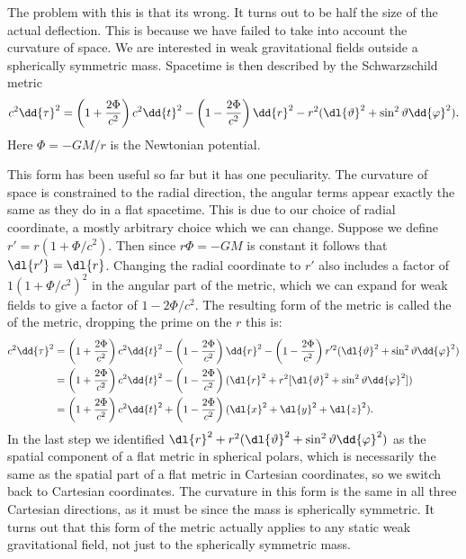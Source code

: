 \documentclass[fleqn]{NotesClass}
\begin{document}
    The problem with this is that its wrong.
    It turns out to be half the size of the actual deflection.
    This is because we have failed to take into account the curvature of space.
    We are interested in weak gravitational fields outside a spherically symmetric mass.
    Spacetime is then described by the Schwarzschild metric
    \begin{equation}
        c^2\dd{\tau}^2 = \left( 1 + \frac{2\Phi}{c^2} \right)c^2\dd{t}^2 - \left( 1 - \frac{2\Phi}{c^2} \right)\dd{r}^2 - r^2(\dl{\vartheta}^2 + \sin^2\vartheta \dd{\varphi}^2).
    \end{equation}
    Here \(\Phi = -GM/r\) is the Newtonian potential.
    
    This form has been useful so far but it has one peculiarity.
    The curvature of space is constrained to the radial direction, the angular terms appear exactly the same as they do in a flat spacetime.
    This is due to our choice of radial coordinate, a mostly arbitrary choice which we can change.
    Suppose we define \(r' = r(1 + \Phi/c^2)\).
    Then since \(r\Phi = -GM\) is constant it follows that \(\dl{r'} = \dl{r}\).
    Changing the radial coordinate to \(r'\) also includes a factor of \(1(1 + \Phi/c^2)^2\) in the angular part of the metric, which we can expand for weak fields to give a factor of \(1 - 2\Phi/c^2\).
    The resulting form of the metric is called the  of the metric, dropping the prime on the \(r\) this is:
    \begin{align}
        c^2\dd{\tau}^2 &= \left( 1 + \frac{2\Phi}{c^2} \right)c^2\dd{t}^2 - \left( 1 - \frac{2\Phi}{c^2} \right) \dd{r}^2 - \left( 1 - \frac{2\Phi}{c^2} \right) r'^2 (\dl{\vartheta}^2 + \sin^2 \vartheta \dd{\varphi}^2)\\
        &= \left( 1 + \frac{2\Phi}{c^2} \right) c^2 \dd{t}^2 - \left( 1 - \frac{2\Phi}{c^2} \right)(\dl{r}^2 + r^2[\dl{\vartheta}^2 + \sin^2\vartheta \dd{\varphi}^2])\\
        &= \left( 1 + \frac{2\Phi}{c^2} \right) c^2 \dd{t}^2 + \left( 1 - \frac{2\Phi}{c^2} \right)(\dl{x}^2 + \dl{y}^2 + \dl{z}^2).
    \end{align}
    In the last step we identified \(\dl{r}^2 + r^2(\dl{\vartheta}^2 + \sin^2\vartheta \dd{\varphi}^2)\) as the spatial component of a flat metric in spherical polars, which is necessarily the same as the spatial part of a flat metric in Cartesian coordinates, so we switch back to Cartesian coordinates.
    The curvature in this form is the same in all three Cartesian directions, as it must be since the mass is spherically symmetric.
    It turns out that this form of the metric actually applies to any static weak gravitational field, not just to the spherically symmetric mass.
    
\end{document}
